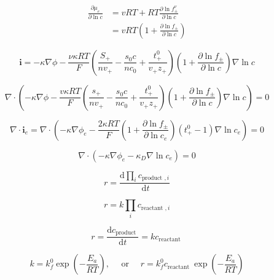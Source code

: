 \documentclass[lettersize,journal]{IEEEtran}
\begin{document}
\begin{equation}
\begin{aligned}
\frac{\partial \mu_{e}}{\partial \ln c} &=v R T+R T \frac{\partial \ln f_{\pm}^{\nu}}{\partial \ln c} \\
&=v R T\left(1+\frac{\partial \ln f_{\pm}}{\partial \ln c}\right)
\end{aligned}
\end{equation}

\begin{equation}
\mathbf{i}=-\kappa \nabla \phi-\frac{\nu \kappa R T}{F}\left(\frac{S_{+}}{n v_{+}}-\frac{s_{0} c}{n c_{0}}+\frac{t_{+}^{0}}{v_{+} z_{+}}\right)\left(1+\frac{\partial \ln f_{\pm}}{\partial \ln c}\right) \nabla \ln c
\end{equation}

\begin{equation}
\nabla \cdot\left(-\kappa \nabla \phi-\frac{v \kappa R T}{F}\left(\frac{s_{+}}{n v_{+}}-\frac{s_{0} c}{n c_{0}}+\frac{t_{+}^{0}}{v_{+} z_{+}}\right)\left(1+\frac{\partial \ln f_{\pm}}{\partial \ln c}\right) \nabla \ln c\right)=0
\end{equation}

\begin{equation}
\nabla \cdot \mathbf{i}_{e}=\nabla \cdot\left(-\kappa \nabla \phi_{e}-\frac{2 \kappa R T}{F}\left(1+\frac{\partial \ln f_{\pm}}{\partial \ln c_{e}}\right)\left(t_{+}^{0}-1\right) \nabla \ln c_{e}\right)=0
\end{equation}

\begin{equation}
\nabla \cdot\left(-\kappa \nabla \phi_{e}-\kappa_{D} \nabla \ln c_{e}\right)=0
\end{equation}

\begin{equation}
r=\frac{\mathrm{d} \prod_{i} c_{\text {product }, i}}{\mathrm{~d} t}
\end{equation}

\begin{equation}
r=k \prod_{i} c_{\text {reactant }, i}
\end{equation}

\begin{equation}
r=\frac{\mathrm{d} c_{\text {product }}}{\mathrm{d} t}=k c_{\text {reactant }}
\end{equation}

\begin{equation}
k=k_{f}^{0} \exp \left(-\frac{E_{a}}{R T}\right), \quad \text { or } \quad r=k_{f}^{0} c_{\text {reactant }} \exp \left(-\frac{E_{a}}{R T}\right)
\end{equation}
\end{document}
